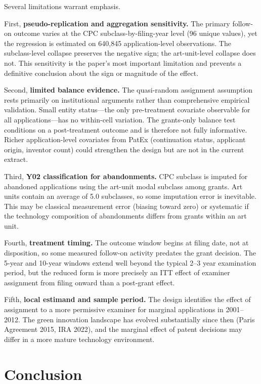 \documentclass[12pt]{article}
\begin{document}
Several limitations warrant emphasis.

First, \textbf{pseudo-replication and aggregation sensitivity.} The primary follow-on outcome varies at the CPC subclass-by-filing-year level (96 unique values), yet the regression is estimated on 640,845 application-level observations. The subclass-level collapse preserves the negative sign; the art-unit-level collapse does not. This sensitivity is the paper's most important limitation and prevents a definitive conclusion about the sign or magnitude of the effect.

Second, \textbf{limited balance evidence.} The quasi-random assignment assumption rests primarily on institutional arguments rather than comprehensive empirical validation. Small entity status---the only pre-treatment covariate observable for all applications---has no within-cell variation. The grants-only balance test conditions on a post-treatment outcome and is therefore not fully informative. Richer application-level covariates from PatEx (continuation status, applicant origin, inventor count) could strengthen the design but are not in the current extract.

Third, \textbf{Y02 classification for abandonments.} CPC subclass is imputed for abandoned applications using the art-unit modal subclass among grants. Art units contain an average of 5.0 subclasses, so some imputation error is inevitable. This may be classical measurement error (biasing toward zero) or systematic if the technology composition of abandonments differs from grants within an art unit.

Fourth, \textbf{treatment timing.} The outcome window begins at filing date, not at disposition, so some measured follow-on activity predates the grant decision. The 5-year and 10-year windows extend well beyond the typical 2--3 year examination period, but the reduced form is more precisely an ITT effect of examiner assignment from filing onward than a post-grant effect.

Fifth, \textbf{local estimand and sample period.} The design identifies the effect of assignment to a more permissive examiner for marginal applications in 2001--2012. The green innovation landscape has evolved substantially since then (Paris Agreement 2015, IRA 2022), and the marginal effect of patent decisions may differ in a more mature technology environment.


\section{Conclusion}
\end{document}
